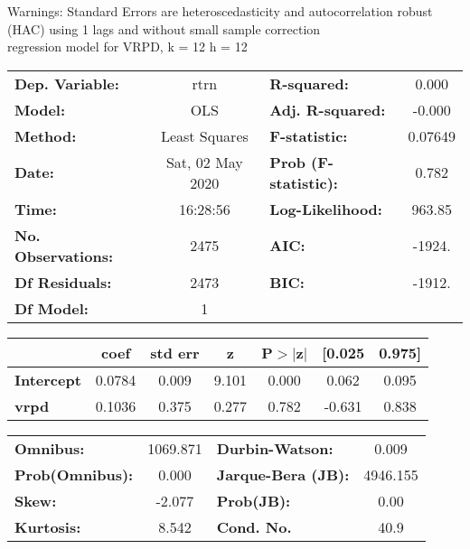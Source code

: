 Warnings: \newline
 [1] Standard Errors are heteroscedasticity and autocorrelation robust (HAC) using 1 lags and without small sample correction\\ 

regression model for VRPD, k = 12 h = 12\begin{center}
\begin{tabular}{lclc}
\toprule
\textbf{Dep. Variable:}    &       rtrn       & \textbf{  R-squared:         } &     0.000   \\
\textbf{Model:}            &       OLS        & \textbf{  Adj. R-squared:    } &    -0.000   \\
\textbf{Method:}           &  Least Squares   & \textbf{  F-statistic:       } &   0.07649   \\
\textbf{Date:}             & Sat, 02 May 2020 & \textbf{  Prob (F-statistic):} &    0.782    \\
\textbf{Time:}             &     16:28:56     & \textbf{  Log-Likelihood:    } &    963.85   \\
\textbf{No. Observations:} &        2475      & \textbf{  AIC:               } &    -1924.   \\
\textbf{Df Residuals:}     &        2473      & \textbf{  BIC:               } &    -1912.   \\
\textbf{Df Model:}         &           1      & \textbf{                     } &             \\
\bottomrule
\end{tabular}
\begin{tabular}{lcccccc}
                   & \textbf{coef} & \textbf{std err} & \textbf{z} & \textbf{P$> |$z$|$} & \textbf{[0.025} & \textbf{0.975]}  \\
\midrule
\textbf{Intercept} &       0.0784  &        0.009     &     9.101  &         0.000        &        0.062    &        0.095     \\
\textbf{vrpd}      &       0.1036  &        0.375     &     0.277  &         0.782        &       -0.631    &        0.838     \\
\bottomrule
\end{tabular}
\begin{tabular}{lclc}
\textbf{Omnibus:}       & 1069.871 & \textbf{  Durbin-Watson:     } &    0.009  \\
\textbf{Prob(Omnibus):} &   0.000  & \textbf{  Jarque-Bera (JB):  } & 4946.155  \\
\textbf{Skew:}          &  -2.077  & \textbf{  Prob(JB):          } &     0.00  \\
\textbf{Kurtosis:}      &   8.542  & \textbf{  Cond. No.          } &     40.9  \\
\bottomrule
\end{tabular}
\end{center}

